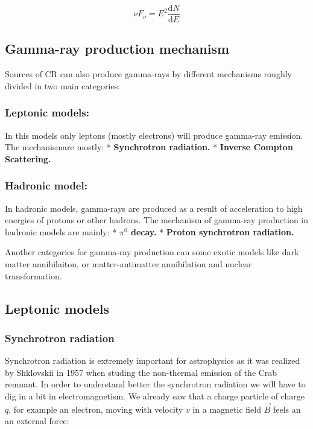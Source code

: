 \documentclass[
  letterpaper,
  DIV=11,
  numbers=noendperiod]{scrreprt}
\begin{document}
\[\nu F_\nu = E^2 \frac{\mathrm{d}N}{\mathrm{d}E}\]

\subsection{Gamma-ray production
mechanism}\label{gamma-ray-production-mechanism}

Sources of CR can also produce gamma-rays by different mechanisms
roughly divided in two main categories:

\subsubsection{Leptonic models:}\label{leptonic-models}

In this models only leptons (mostly electrons) will produce gamma-ray
emission. The mechanismare mostly: * \textbf{Synchrotron radiation.} *
\textbf{Inverse Compton Scattering.}

\subsubsection{Hadronic model:}\label{hadronic-model}

In hadronic models, gamma-rays are produced as a result of acceleration
to high energies of protons or other hadrons. The mechanism of gamma-ray
production in hadronic models are mainly: * \textbf{\(\pi^0\) decay.} *
\textbf{Proton synchrotron radiation.}

Another categories for gamma-ray production can some exotic models like
dark matter annihilaiton, or matter-antimatter annihilation and nuclear
transformation.

\subsection{Leptonic models}\label{leptonic-models-1}

\subsubsection{Synchrotron radiation}\label{synchrotron-radiation}

Synchrotron radiation is extremely important for astrophysics as it was
realized by Shklovskii in 1957 when studing the non-thermal emission of
the Crab remnant. In order to understand better the synchrotron
radiation we will have to dig in a bit in electromagnetism. We already
saw that a charge particle of charge \(q\), for example an electron,
moving with velocity \(v\) in a magnetic field \(\vec{B}\) feels an an
external force:
\end{document}
